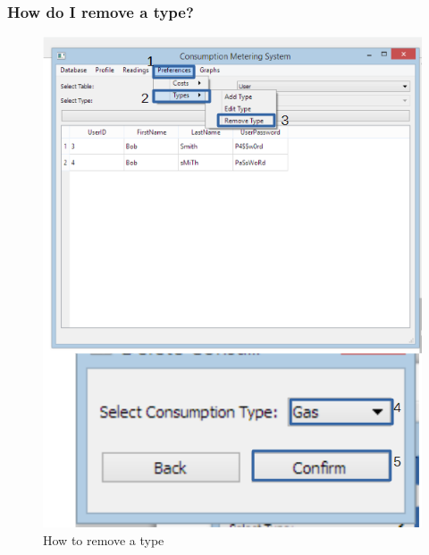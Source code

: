 \subsubsection{How do I remove a type?}\label{question:remove_type}
\begin{figure}[H]
	\includegraphics{./manual/images/remove_type.png}
	\caption{How to remove a type}
\end{figure}

